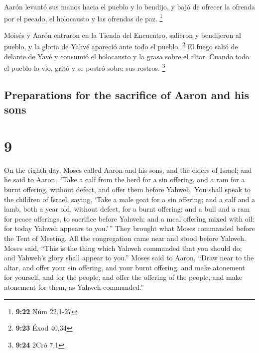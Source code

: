 \begin{paracol}{2}
 Aarón levantó sus manos hacia el pueblo y lo bendijo, y
bajó de ofrecer la ofrenda por el pecado, el holocausto y las ofrendas
de paz. \footnote{\textbf{9:22} Núm 22,1-27}

 Moisés y Aarón entraron en la Tienda del Encuentro,
salieron y bendijeron al pueblo, y la gloria de Yahvé apareció ante todo
el pueblo. \footnote{\textbf{9:23} Éxod 40,34}  El fuego
salió de delante de Yavé y consumió el holocausto y la grasa sobre el
altar. Cuando todo el pueblo lo vio, gritó y se postró sobre sus
rostros. \footnote{\textbf{9:24} 2Cró 7,1}

\switchcolumn
\begin{otherlanguage}{english}

\hypertarget{preparations-for-the-sacrifice-of-aaron-and-his-sons}{%
\subsection{Preparations for the sacrifice of Aaron and his
sons}\label{preparations-for-the-sacrifice-of-aaron-and-his-sons}}

\hypertarget{section-17}{%
\section{9}\label{section-17}}

 On the eighth day, Moses called Aaron and his sons, and
the elders of Israel;  and he said to Aaron, ``Take a calf
from the herd for a sin offering, and a ram for a burnt offering,
without defect, and offer them before Yahweh.  You shall
speak to the children of Israel, saying, `Take a male goat for a sin
offering; and a calf and a lamb, both a year old, without defect, for a
burnt offering;  and a bull and a ram for peace offerings,
to sacrifice before Yahweh; and a meal offering mixed with oil: for
today Yahweh appears to you.'\,''  They brought what Moses
commanded before the Tent of Meeting. All the congregation came near and
stood before Yahweh.  Moses said, ``This is the thing
which Yahweh commanded that you should do; and Yahweh's glory shall
appear to you.''  Moses said to Aaron, ``Draw near to the
altar, and offer your sin offering, and your burnt offering, and make
atonement for yourself, and for the people; and offer the offering of
the people, and make atonement for them, as Yahweh commanded.''


\end{otherlanguage}
\end{paracol}
